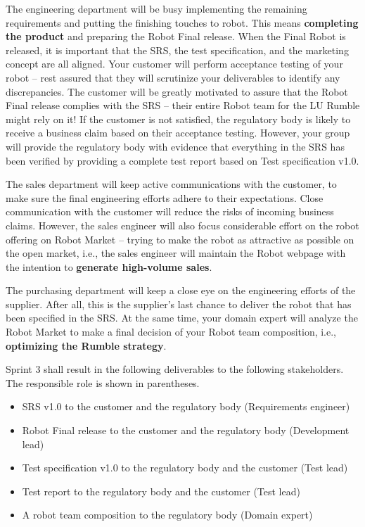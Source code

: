 \documentclass{scrreprt}
\begin{document}
The engineering department will be busy implementing the remaining requirements and putting the finishing touches to robot. This means \textbf{completing the product} and preparing the Robot Final release. When the Final Robot is released, it is important that the SRS, the test specification, and the marketing concept are all aligned. Your customer will perform acceptance testing of your robot -- rest assured that they will scrutinize your deliverables to identify any discrepancies. The customer will be greatly motivated to assure that the Robot Final release complies with the SRS -- their entire Robot team for the LU Rumble might rely on it! If the customer is not satisfied, the regulatory body is likely to receive a business claim based on their acceptance testing. However, your group will provide the regulatory body with evidence that everything in the SRS has been verified by providing a complete test report based on Test specification v1.0.
 
The sales department will keep active communications with the customer, to make sure the final engineering efforts adhere to their expectations. Close communication with the customer will reduce the risks of incoming business claims. However, the sales engineer will also focus considerable effort on the robot offering on Robot Market -- trying to make the robot as attractive as possible on the open market, i.e., the sales engineer will maintain the Robot webpage with the intention to \textbf{generate high-volume sales}.

The purchasing department will keep a close eye on the engineering efforts of the supplier. After all, this is the supplier's last chance to deliver the robot that has been specified in the SRS. At the same time, your domain expert will analyze the Robot Market to make a final decision of your Robot team composition, i.e., \textbf{optimizing the Rumble strategy}. 

Sprint 3 shall result in the following deliverables to the following stakeholders. The responsible role is shown in parentheses.
\begin{itemize}
\item SRS v1.0 to the customer and the regulatory body (Requirements engineer)
\item Robot Final release to the customer and the regulatory body (Development lead)
\item Test specification v1.0 to the regulatory body and the customer (Test lead)
\item Test report to the regulatory body and the customer (Test lead)
\item A robot team composition to the regulatory body (Domain expert)
\end{itemize}
\end{document}
